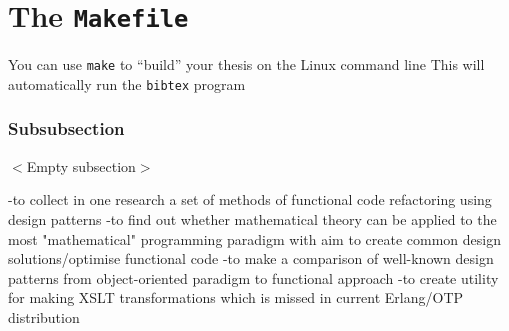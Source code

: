\section{The \texttt{Makefile}}

You can use \texttt{make} to ``build'' your thesis on the Linux command
line This will
automatically run the \texttt{bibtex} program

\subsubsection{Subsubsection}
\textsf{$<$Empty subsection$>$}


-to collect in one research a set of methods of functional code refactoring using design patterns
-to find out whether mathematical theory can be applied to the most "mathematical" programming paradigm with aim to create common design solutions/optimise functional code
-to make a comparison of well-known design patterns from object-oriented paradigm to functional approach
-to create utility for making XSLT transformations which is missed in current Erlang/OTP distribution


